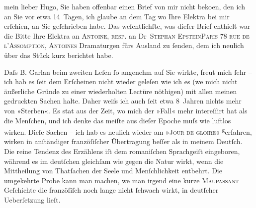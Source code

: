 \pstart{}mein lieber Hugo, \pend\vspace{0.5em}
\pstart
           Sie haben offenbar einen Brief von mir nicht beko{\geminationm}en,
               den ich an Sie vor etwa 14 Tagen, ich glaube an dem Tag wo Ihre Elektra bei mir erſchien, an Sie geſchrieben habe. Das
               weſentlichſte, was dieſer Brief enthielt war die Bitte Ihre Elektra an \textsc{Antoine}, \textsc{resp}. an Dr \textsc{Stephan EpsteinParis 78 rue de l’Assomption, Antoines} Dramaturgen fürs Ausland zu
               ſenden, dem ich neulich  über das Stück kurz berichtet habe.\pend
           
\pstart
           {\pb}Daſs \introOben{}B.\introOben{} Garlan beim zweiten Leſen ſo angenehm auf Sie
               wirkte, freut mich ſehr – ich hab es ſeit dem Erſcheinen nicht wieder geleſen wie ich
               es (we{\geminationn} mich nicht äußerliche Gründe zu einer
               wiederholten Lectüre nöthigen) mit allen meinen gedruckten Sachen halte. Daher weiſs
               ich auch ſeit etwa 8 Jahren nichts mehr von »Sterben«. Es sta{\geminationm}t aus der Zeit, wo mich der
               »Fall« mehr intereſſirt hat als die Menſchen, und ich denke das meiſte aus dieſer
               Epoche muſs wie luftlos wirken. Dieſe Sachen – ich hab es neulich wieder am »\textsc{Jour de {\pb}gloire}« \substVorne{}\textsuperscript{g}\substDazwischen{}e\substHinten{}rfahren, wirken in anſtändiger franzöſiſcher Übertragung beſſer als in meinem
               Deutſch. Die reine Tendenz des Erzählens iſt dem romaniſchen Sprachgeiſt eingeboren,
               während es im deutſchen gleichſam wie gegen die Natur wirkt, wenn die Mittheilung von
               Thatſachen der Seele und Menſchlichkeit entbehrt. Die umgekehrte Probe kann man
               machen, we{\geminationn} man irgend eine kurze \textsc{Maupassant} Geſchichte die franzöſiſch noch lange nicht ſchwach wirkt, in deutſcher
               Ueberſetzung lieſt.\pend
           
